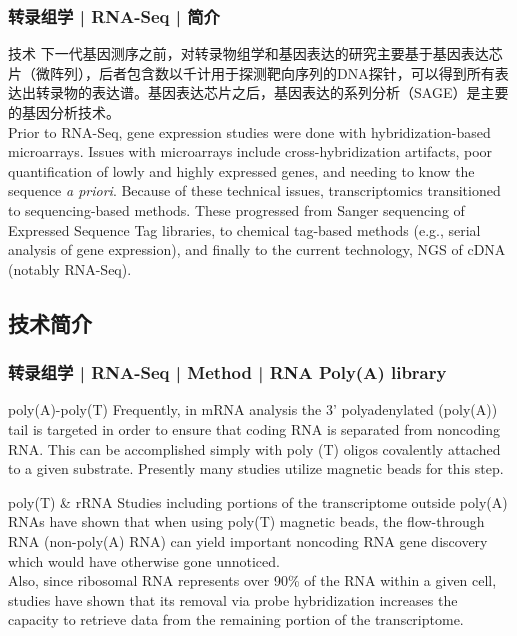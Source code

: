 \begin{frame}
  \frametitle{转录组学 | RNA-Seq | 简介}
  \begin{block}{技术}
下一代基因测序之前，对转录物组学和基因表达的研究主要基于基因表达芯片（微阵列），后者包含数以千计用于探测靶向序列的DNA探针，可以得到所有表达出转录物的表达谱。基因表达芯片之后，基因表达的系列分析（SAGE）是主要的基因分析技术。\\
\vspace{1em}
Prior to RNA-Seq, gene expression studies were done with hybridization-based microarrays. Issues with microarrays include cross-hybridization artifacts, poor quantification of lowly and highly expressed genes, and needing to know the sequence \textit{a priori}. Because of these technical issues, transcriptomics transitioned to sequencing-based methods. These progressed from Sanger sequencing of Expressed Sequence Tag libraries, to chemical tag-based methods (e.g., serial analysis of gene expression), and finally to the current technology, NGS of cDNA (notably RNA-Seq).
  \end{block}
\end{frame}

\subsection{技术简介}
\begin{frame}
  \frametitle{转录组学 | RNA-Seq | Method | RNA Poly(A) library}
  \begin{block}{poly(A)-poly(T)}
    Frequently, in mRNA analysis the 3' polyadenylated (poly(A)) tail is targeted in order to ensure that coding RNA is separated from noncoding RNA. This can be accomplished simply with poly (T) oligos covalently attached to a given substrate. Presently many studies utilize magnetic beads for this step.
  \end{block}
  \pause
  \begin{block}{poly(T) \& rRNA}
    Studies including portions of the transcriptome outside poly(A) RNAs have shown that when using poly(T) magnetic beads, the flow-through RNA (non-poly(A) RNA) can yield important noncoding RNA gene discovery which would have otherwise gone unnoticed.\\
    \vspace{0.2em}
    Also, since ribosomal RNA represents over 90\% of the RNA within a given cell, studies have shown that its removal via probe hybridization increases the capacity to retrieve data from the remaining portion of the transcriptome.
  \end{block}
\end{frame}

